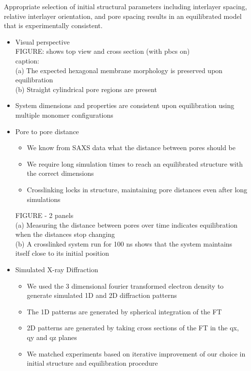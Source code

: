 \documentclass{article}
\begin{document}
	Appropriate selection of initial structural parameters including interlayer spacing, relative interlayer orientation, and pore spacing results in an equilibrated model that is experimentally consistent.
	\begin{itemize}
		\item Visual perspective \\
		FIGURE: shows top view and cross section (with pbcs on)\\
		caption: \\ 
		(a) The expected hexagonal membrane morphology is preserved upon equilibration \\
		(b) Straight cylindrical pore regions are present \\
		\item System dimensions and properties are consistent upon equilibration using multiple monomer configurations 
		\item Pore to pore distance
		\begin{itemize}
			\item We know from SAXS data what the distance between pores should be
			\item We require long simulation times to reach an equilibrated structure with the correct dimensions
			\item Crosslinking locks in structure, maintaining pore distances even after long simulations
		\end{itemize}

		FIGURE - 2 panels \\
		(a) Measuring the distance between pores over time indicates equilibration when the distances stop changing \\
		(b) A crosslinked system run for 100 ns shows that the system maintains itself close to its initial position \\
 
		\item Simulated X-ray Diffraction
		\begin{itemize}
			\item We used the 3 dimensional fourier transformed electron density to generate simulated 1D and 2D diffraction patterns
			\item The 1D patterns are generated by spherical integration of the FT
			\item 2D patterns are generated by taking cross sections of the FT in the qx, qy and qz planes
			\item We matched experiments based on iterative improvement of our choice in initial structure and equilibration procedure
		\end{itemize}
	        

\end{itemize}
\end{document}
